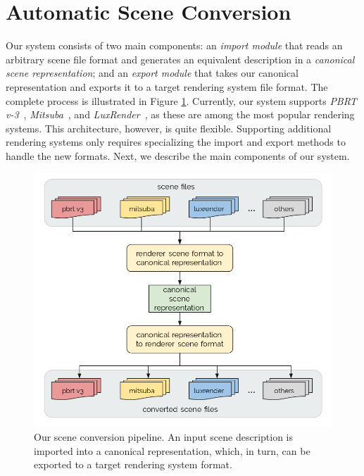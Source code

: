 \section{Automatic Scene Conversion} 
\label{sec:systemarch}

Our system consists of two main components: an {\it import module} that reads an arbitrary scene file format and generates an equivalent description in a {\it canonical scene representation}; and an {\it export module} that takes our canonical representation and exports it to a target rendering system file format. The complete process is illustrated in Figure \ref{fig:sysarch}. 
Currently, our system supports \textit{PBRT v-3}~\cite{PBRT:v3}, \textit{Mitsuba}~\cite{mitsuba}, and \textit{LuxRender}~\cite{luxrender}, as these are among the most popular rendering systems.
This architecture, however, is quite flexible. Supporting additional rendering systems only requires specializing the import and export methods to handle the new formats. 
%
Next, we describe the main components of our system.





\begin{figure}[h]
\centering
\includegraphics[width=0.8\linewidth]{figs/3_system_architecture/architecture.png}
\caption{Our scene conversion pipeline. An input scene description is imported into a canonical representation, which, in turn, can be exported to a target rendering system format.}
\label{fig:sysarch}
\end{figure}

